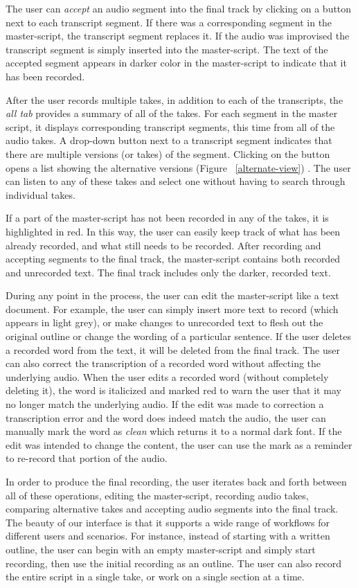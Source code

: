 The user can \textit{accept} an audio segment into the final track
by clicking on a button next to each transcript segment. If there was
a corresponding  segment in the master-script, the transcript segment
replaces it. If the audio was improvised the transcript segment
is simply inserted into the master-script.
The text of the accepted segment appears in
darker color in the master-script to indicate that it has been recorded. 

After the user records multiple takes, in addition to each of the transcripts, the \textit{all tab} provides a summary of all of the takes. For each segment in the master script, it displays corresponding transcript segments, this time from all of the audio takes. A drop-down button next to a transcript segment  indicates that there are multiple versions (or takes)  of the  segment. Clicking on the button opens a
list showing the alternative versions (Figure ~\ref{alternate-view}) . The user can listen to any of these takes and select one without having to search through individual takes. 

If a part of the master-script has not been recorded in any of the takes, it is highlighted in red. In this way, the user can easily keep track of what has been already recorded, and what still needs to be recorded. After recording and accepting segments to the final track, the master-script contains both recorded and unrecorded text.
The final track includes only the darker, recorded text. 

 During any point in the process, the user can edit the master-script like a text document.
For example, the user can simply insert
more text to record (which appears in light grey), or make changes
to unrecorded text to flesh out the original outline
or change the wording of a particular sentence. If the user deletes a recorded word from the text, it will be deleted from the final track. The user can also correct the transcription of a recorded word without affecting the underlying audio. When the user edits a recorded word (without completely deleting it), the word is italicized and marked red to warn the user that it may no longer match the underlying audio. If the edit was made to correction a transcription error and the word does indeed match the audio, the user can manually mark the word as \textit{clean} which returns it to a normal dark font. If the edit was intended to change the content, the user can use the mark as a reminder to re-record that portion of the audio.

   

In order to produce the final recording, the user iterates back and forth between all of these operations, editing the master-script, recording audio takes, comparing alternative takes and accepting audio segments into the final track.
The beauty of our interface is that it supports a wide range of workflows for different users and scenarios. For instance, instead of starting with a written outline, the user can begin with an empty master-script and simply start recording,  then use  the initial recording as an outline. The user can also record the entire script in a single take, or work on a single section at a time. 
